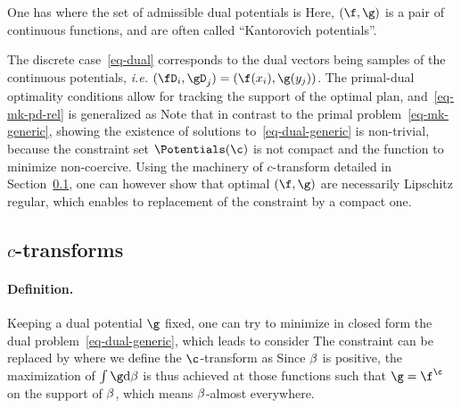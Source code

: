 	
\begin{prop}
	One has
	where the set of admissible dual potentials is
	Here, $(\f,\g)$ is a pair of continuous functions, and are often called ``Kantorovich potentials''.
\end{prop}

The discrete case~\eqref{eq-dual} corresponds to the dual vectors being samples of the continuous potentials, \emph{i.e.} $(\fD_i,\gD_j)=(\f(x_i),\g(y_j))$. 
	The primal-dual optimality conditions allow for tracking the support of the optimal plan, and~\eqref{eq-mk-pd-rel} is generalized as 
	Note that in contrast to the primal problem~\eqref{eq-mk-generic}, showing the existence of solutions to~\eqref{eq-dual-generic} is non-trivial, because the constraint set $\Potentials(\c)$ is not compact and the function to minimize non-coercive.
	Using the machinery of $c$-transform detailed in Section~\ref{sec-c-transfo}, one can however show that optimal $(\f,\g)$ are necessarily Lipschitz regular, which enables to replacement of the constraint by a compact one. 



\subsection{$c$-transforms}
\label{sec-c-transfo}

\paragraph{Definition.}

Keeping a dual potential $\g$ fixed, one can try to minimize in closed form the dual problem~\eqref{eq-dual-generic}, which leads to consider
The constraint can be replaced by
where we define the $\c$-transform as 
Since $\beta$ is positive, the maximization of $\int \g \d \be$ is thus achieved at those functions such that $\g=\f^\c$ on the support of $\beta$, which means $\beta$-almost everywhere.

